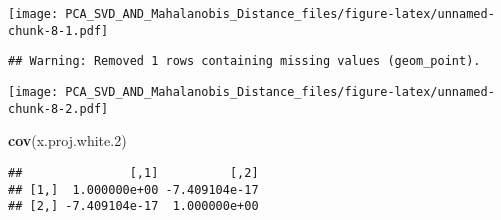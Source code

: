 \documentclass[]{article}
\newenvironment{Shaded}{\begin{snugshade}}{\end{snugshade}}
\newcommand{\KeywordTok}[1]{\textcolor[rgb]{0.13,0.29,0.53}{\textbf{{#1}}}}
\newcommand{\DataTypeTok}[1]{\textcolor[rgb]{0.13,0.29,0.53}{{#1}}}
\newcommand{\DecValTok}[1]{\textcolor[rgb]{0.00,0.00,0.81}{{#1}}}
\newcommand{\FloatTok}[1]{\textcolor[rgb]{0.00,0.00,0.81}{{#1}}}
\newcommand{\StringTok}[1]{\textcolor[rgb]{0.31,0.60,0.02}{{#1}}}
\newcommand{\NormalTok}[1]{{#1}}
\begin{document}
\texttt{[image: PCA\_SVD\_AND\_Mahalanobis\_Distance\_files/figure-latex/unnamed-chunk-8-1.pdf]}

\begin{Shaded}
\end{Shaded}

\begin{verbatim}
## Warning: Removed 1 rows containing missing values (geom_point).
\end{verbatim}

\texttt{[image: PCA\_SVD\_AND\_Mahalanobis\_Distance\_files/figure-latex/unnamed-chunk-8-2.pdf]}

\begin{Shaded}
\begin{Highlighting}[]
\KeywordTok{cov}\NormalTok{(x.proj.white}\FloatTok{.2}\NormalTok{)}
\end{Highlighting}
\end{Shaded}

\begin{verbatim}
##               [,1]          [,2]
## [1,]  1.000000e+00 -7.409104e-17
## [2,] -7.409104e-17  1.000000e+00
\end{verbatim}
\end{document}
